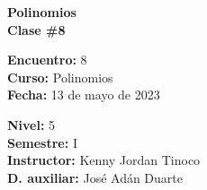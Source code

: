 \begin{center} \textbf
{
    \Large Polinomios \\ \vspace{2mm}Clase \#8
}
\end{center}

\begin{multicols}{2}
{
    \textbf{Encuentro:} 8\\
    \textbf{Curso:} Polinomios\\
    \textbf{Fecha:} 13 de mayo de 2023\\
    \begin{flushright}
        \textbf{Nivel:} 5\\
        \textbf{Semestre:} I\\
        \textbf{Instructor:} Kenny Jordan Tinoco\\
        \textbf{D. auxiliar: }José Adán Duarte
    \end{flushright}
}
\end{multicols}

\thispagestyle{first-page-style}